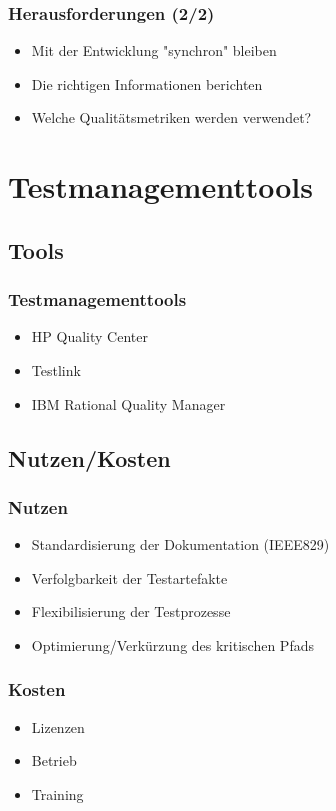 \begin{frame}
	\frametitle{Herausforderungen (2/2)}
	\begin{itemize}
		\item Mit der Entwicklung "synchron" bleiben
		\item Die richtigen Informationen berichten
		\item Welche Qualit\"atsmetriken werden verwendet?
	\end{itemize}
\end{frame}

\section{Testmanagementtools}
\subsection{Tools}
\begin{frame}
	\frametitle{Testmanagementtools}
	\begin{itemize}
		\item HP Quality Center
		\item Testlink
		\item IBM Rational Quality Manager
	\end{itemize}
\end{frame}

\subsection{Nutzen/Kosten}
\begin{frame}
	\frametitle{Nutzen}
	\begin{itemize}
		\item Standardisierung der Dokumentation (IEEE829)
		\item Verfolgbarkeit der Testartefakte
		\item Flexibilisierung der Testprozesse
		\item Optimierung/Verk\"urzung des kritischen Pfads
	\end{itemize}
\end{frame}

\begin{frame}
	\frametitle{Kosten}
	\begin{itemize}
		\item Lizenzen
		\item Betrieb
		\item Training
	\end{itemize}
\end{frame}

